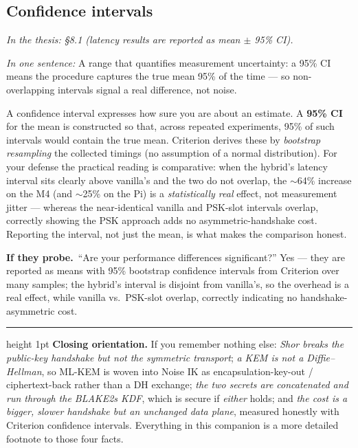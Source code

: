 \documentclass[11pt]{article}
\newcommand{\seethesis}[1]{%
  {\small\color{softgray}\textit{In the thesis: #1}}\par\vspace{3pt}}
\newcommand{\keyq}[1]{%
  \par\vspace{0.4em}%
  \noindent\colorbox{boxbg}{%
    \parbox{\dimexpr\textwidth-2\fboxsep}{%
      \small\textbf{\color{deepcyan}If they probe.}\ #1}}%
  \par\vspace{0.5em}}
\newcommand{\nutshell}[1]{\noindent\textit{In one sentence:} #1\par\vspace{4pt}}
\begin{document}
\subsection{Confidence intervals}
\seethesis{\S8.1 (latency results are reported as mean $\pm$ 95\% CI).}
\nutshell{A range that quantifies measurement uncertainty: a 95\% CI means the
procedure captures the true mean 95\% of the time --- so non-overlapping
intervals signal a real difference, not noise.}

A confidence interval expresses how sure you are about an estimate. A
\textbf{95\% CI} for the mean is constructed so that, across repeated
experiments, 95\% of such intervals would contain the true mean. Criterion derives
these by \emph{bootstrap resampling} the collected timings (no assumption of a
normal distribution). For your defense the practical reading is comparative: when
the hybrid's latency interval sits clearly above vanilla's and the two do not
overlap, the $\sim$64\% increase on the M4 (and $\sim$25\% on the Pi) is a
\emph{statistically real} effect, not measurement jitter --- whereas the
near-identical vanilla and PSK-slot intervals overlap, correctly showing the PSK
approach adds no asymmetric-handshake cost. Reporting the interval, not just the
mean, is what makes the comparison honest.

\keyq{``Are your performance differences significant?'' Yes --- they are reported
as means with 95\% bootstrap confidence intervals from Criterion over many
samples; the hybrid's interval is disjoint from vanilla's, so the overhead is a
real effect, while vanilla vs.\ PSK-slot overlap, correctly indicating no
handshake-asymmetric cost.}

\vspace{1.2em}
\hrule height 1pt
\vspace{0.6em}
\noindent\textbf{\color{deepcyan}Closing orientation.} If you remember nothing
else: \emph{Shor breaks the public-key handshake but not the symmetric transport};
\emph{a KEM is not a Diffie--Hellman}, so ML-KEM is woven into Noise IK as
encapsulation-key-out / ciphertext-back rather than a DH exchange; \emph{the two
secrets are concatenated and run through the BLAKE2s KDF}, which is secure if
\emph{either} holds; and \emph{the cost is a bigger, slower handshake but an
unchanged data plane}, measured honestly with Criterion confidence intervals.
Everything in this companion is a more detailed footnote to those four facts.
\end{document}
